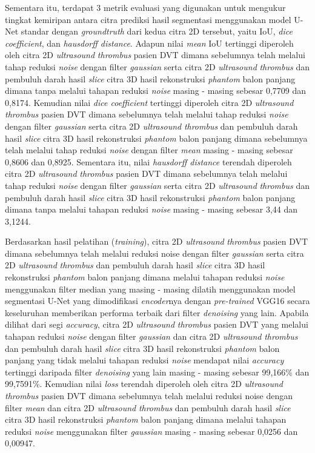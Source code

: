 Sementara itu, terdapat 3 metrik evaluasi yang digunakan untuk mengukur tingkat kemiripan antara citra prediksi hasil segmentasi menggunakan model U-Net standar dengan \textit{groundtruth} dari kedua citra 2D tersebut, yaitu IoU, \textit{dice coefficient}, dan \textit{hausdorff distance}. Adapun nilai \textit{mean} IoU tertinggi diperoleh oleh citra 2D \textit{ultrasound} \textit{thrombus} pasien DVT dimana sebelumnya telah melalui tahap reduksi \textit{noise} dengan filter \textit{gaussian} serta citra 2D \textit{ultrasound} \textit{thrombus} dan pembuluh darah hasil \textit{slice} citra 3D hasil rekonstruksi \textit{phantom} balon panjang dimana tanpa melalui tahapan reduksi \textit{noise} masing - masing sebesar 0,7709 dan 0,8174. Kemudian nilai \textit{dice coefficient} tertinggi diperoleh citra 2D \textit{ultrasound} \textit{thrombus} pasien DVT dimana sebelumnya telah melalui tahap reduksi \textit{noise} dengan filter \textit{gaussian} serta citra 2D \textit{ultrasound} \textit{thrombus} dan pembuluh darah hasil \textit{slice} citra 3D hasil rekonstruksi \textit{phantom} balon panjang dimana sebelumnya telah melalui tahap reduksi \textit{noise} dengan filter \textit{mean} masing - masing sebesar 0,8606 dan 0,8925. Sementara itu, nilai \textit{hausdorff distance} terendah diperoleh citra 2D \textit{ultrasound} \textit{thrombus} pasien DVT dimana sebelumnya telah melalui tahap reduksi \textit{noise} dengan filter \textit{gaussian} serta citra 2D \textit{ultrasound} \textit{thrombus} dan pembuluh darah hasil \textit{slice} citra 3D hasil rekonstruksi \textit{phantom} balon panjang dimana tanpa melalui tahapan reduksi \textit{noise} masing - masing sebesar 3,44 dan 3,1244. 

Berdasarkan hasil pelatihan (\textit{training}), citra 2D \textit{ultrasound} \textit{thrombus} pasien DVT dimana sebelumnya telah melalui reduksi noise dengan filter \textit{gaussian} serta citra 2D \textit{ultrasound} \textit{thrombus} dan pembuluh darah hasil \textit{slice} citra 3D hasil rekonstruksi \textit{phantom} balon panjang dimana melalui tahapan reduksi \textit{noise} menggunakan filter median yang masing - masing dilatih menggunakan model segmentasi U-Net yang dimodifikasi \textit{encoder}nya dengan \textit{pre-trained} VGG16 secara keseluruhan memberikan performa terbaik dari filter \textit{denoising} yang lain. Apabila dilihat dari segi \textit{accuracy}, citra 2D \textit{ultrasound} \textit{thrombus} pasien DVT yang melalui tahapan reduksi \textit{noise} dengan filter \textit{gaussian} dan citra 2D \textit{ultrasound} \textit{thrombus} dan pembuluh darah hasil \textit{slice} citra 3D hasil rekonstruksi \textit{phantom} balon panjang yang tidak melalui tahapan reduksi \textit{noise} mendapat nilai \textit{accuracy} tertinggi daripada filter \textit{denoising} yang lain masing - masing sebesar 99,166\% dan 99,7591\%. Kemudian nilai \textit{loss} terendah diperoleh oleh citra 2D \textit{ultrasound} \textit{thrombus} pasien DVT dimana sebelumnya telah melalui reduksi noise dengan filter \textit{mean} dan citra 2D \textit{ultrasound} \textit{thrombus} dan pembuluh darah hasil \textit{slice} citra 3D hasil rekonstruksi \textit{phantom} balon panjang dimana melalui tahapan reduksi \textit{noise} menggunakan filter \textit{gaussian} masing - masing sebesar 0,0256 dan 0,00947.



